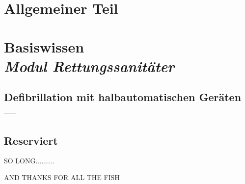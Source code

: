 \documentclass[ngerman,a4paper,fontsize=9pt,BCOR=1.5cm,headings=big,draft=no]{scrbook}
\begin{document}
\listoffigures

\printindex





% 
 

\part{Allgemeiner Teil}







\addtocounter{chapter}{2}

\part{Basiswissen \\ \emph{Modul Rettungssanitäter}}





\chapter{Defibrillation mit halbautomatischen Geräten ---
}

















\chapter{Reserviert }










SO LONG..........

AND THANKS FOR ALL THE FISH
\end{document}

